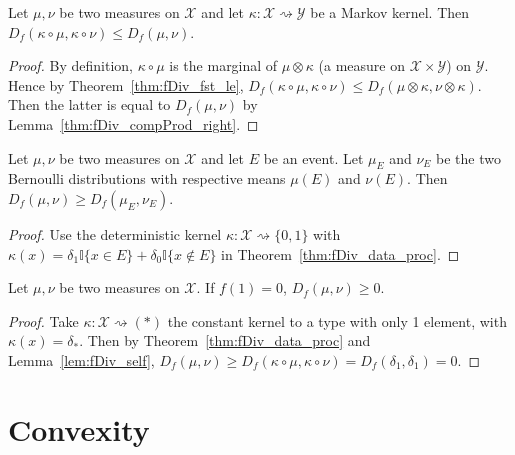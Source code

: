 \begin{theorem}
  \label{thm:fDiv_data_proc}
  Let $\mu, \nu$ be two measures on $\mathcal X$ and let $\kappa : \mathcal X \rightsquigarrow \mathcal Y$ be a Markov kernel.
  Then $D_f(\kappa \circ \mu, \kappa \circ \nu) \le D_f(\mu, \nu)$.
\end{theorem}

\begin{proof}
By definition, $\kappa \circ \mu$ is the marginal of $\mu \otimes \kappa$ (a measure on $\mathcal X \times \mathcal Y$) on $\mathcal Y$. Hence by Theorem~\ref{thm:fDiv_fst_le}, $D_f(\kappa \circ \mu, \kappa \circ \nu) \le D_f(\mu \otimes \kappa, \nu \otimes \kappa)$. Then the latter is equal to $D_f(\mu, \nu)$ by Lemma~\ref{thm:fDiv_compProd_right}.
\end{proof}

\begin{corollary}
  \label{cor:data_proc_event}
  Let $\mu, \nu$ be two measures on $\mathcal X$ and let $E$ be an event. Let $\mu_E$ and $\nu_E$ be the two Bernoulli distributions with respective means $\mu(E)$ and $\nu(E)$. Then $D_f(\mu, \nu) \ge D_f(\mu_E, \nu_E)$.
\end{corollary}

\begin{proof}
Use the deterministic kernel $\kappa : \mathcal X \rightsquigarrow \{0, 1\}$ with $\kappa(x) = \delta_1 \mathbb{I}\{x \in E\} + \delta_0 \mathbb{I}\{x \notin E\}$ in Theorem~\ref{thm:fDiv_data_proc}.
\end{proof}

\begin{lemma}
  \label{lem:fDiv_nonneg}
  Let $\mu, \nu$ be two measures on $\mathcal X$. If $f(1) = 0$, $D_f(\mu, \nu) \ge 0$.
\end{lemma}

\begin{proof}
Take $\kappa : \mathcal X \rightsquigarrow (*)$ the constant kernel to a type with only 1 element, with $\kappa(x) = \delta_*$.
Then by Theorem~\ref{thm:fDiv_data_proc} and Lemma~\ref{lem:fDiv_self}, $D_f(\mu, \nu) \ge D_f(\kappa \circ \mu, \kappa \circ \nu) = D_f(\delta_1, \delta_1) = 0$.
\end{proof}

\section{Convexity}

